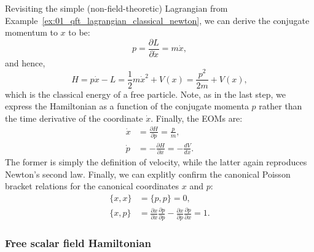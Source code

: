 \begin{example}
\label{ex:01_qft_hamiltonian}
Revisiting the simple (non-field-theoretic) Lagrangian from Example~\ref{ex:01_qft_lagrangian_classical_newton}, we can derive the conjugate momentum to $x$ to be:
\begin{equation}
	\label{eq:01_qft_hamiltonian_example_momenta}
	p = \frac{\partial L}{\partial\dot x} = m\dot x,
\end{equation}
and hence,
\begin{equation}
	\label{eq:01_qft_hamiltonian_example}
	H = p\dot x - L = \frac{1}{2}m\dot x^2 + V(x) = \frac{p^2}{2m} + V(x),
\end{equation}
which is the classical energy of a free particle.
Note, as in the last step, we express the Hamiltonian as a function of the conjugate momenta $p$ rather than the time derivative of the coordinate $\dot x$.
Finally, the EOMs are:
\begin{equation}
	\label{eq:01_qft_hamiltonian_example_eoms}
	\begin{split}
		\dot x &= \frac{\partial H}{\partial p} = \frac{p}{m}, \\
		\dot p &= -\frac{\partial H}{\partial x} = -\frac{dV}{dx}.
	\end{split}
\end{equation}
The former is simply the definition of velocity, while the latter again reproduces Newton's second law.
Finally, we can explitly confirm the canonical Poisson bracket relations for the canonical coordinates $x$ and $p$:
\begin{equation}
	\label{eq:01_qft_hamiltonian_example_poisson}
	\begin{split}
		\{x, x\} &= \{p, p\} = 0, \\
		\{x, p\} &= \frac{\partial x}{\partial x}\frac{\partial p}{\partial p} - \frac{\partial x}{\partial p}\frac{\partial p}{\partial x} = 1.
	\end{split}
\end{equation}
\end{example}

\subsubsection{Free scalar field Hamiltonian}


